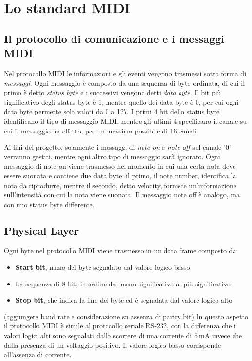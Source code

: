 \chapter{Lo standard MIDI}

\section{Il protocollo di comunicazione e i messaggi MIDI}
Nel protocollo MIDI le informazioni e gli eventi vengono trasmessi sotto forma di \textit{messaggi}.
Ogni messaggio è composto da una sequenza di byte ordinata, di cui il primo è detto \textit{status byte} e i successivi
vengono detti \textit{data byte}.
Il bit più significativo degli status byte è 1, mentre quello dei data byte è 0, per cui ogni data byte permette
solo valori da 0 a 127. I primi 4 bit dello status byte identificano il tipo di messaggio MIDI, mentre gli ultimi 4 specificano il canale su cui il messaggio ha effetto, per un massimo possibile di 16 canali.

Ai fini del progetto, solamente i messaggi di \textit{note on} e \textit{note off} sul canale '0' verranno gestiti, mentre
ogni altro tipo di messaggio sarà ignorato.
Ogni messaggio di note on viene trasmesso nel momento in cui una certa nota deve essere suonata e contiene due data byte: il primo, il note number, identifica la nota da riprodurre, mentre il secondo, detto velocity, fornisce un'informazione
sull'intensità con cui la nota viene suonata.
Il messaggio note off è analogo, ma con uno status byte differente.


\section{Physical Layer}
Ogni byte nel protocollo MIDI viene trasmesso in un data frame composto da:
\begin{itemize}
	\item \textbf{Start bit}, inizio del byte segnalato dal valore logico basso
	\item
	 La sequenza di 8 bit, in ordine dal meno significativo al più significativo
	\item \textbf{Stop bit}, che indica la fine del byte ed è segnalata dal valore logico alto
\end{itemize}

(aggiungere baud rate e considerazione su assenza di parity bit)
In questo aspetto il protocollo MIDI è simile al protocollo seriale RS-232, con la differenza che i valori logici alti sono segnalati dallo scorrere di una corrente di $\SI{5}{\milli\ampere}$ invece che dalla presenza di un voltaggio positivo.
Il valore logico basso corrisponde all'assenza di corrente.

